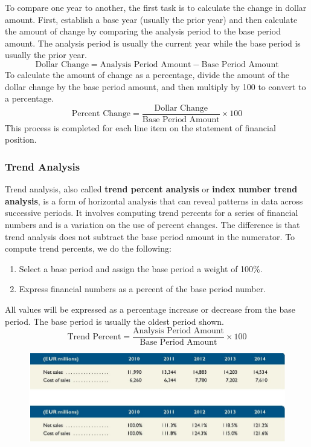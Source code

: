 \documentclass[../main.tex]{subfiles}
\begin{document}
	To compare one year to another, the first task is to calculate the change 
	in dollar amount.  First, establish a base year (usually the prior year) 
	and then calculate the amount of change by comparing the analysis period to 
	the base period amount. The analysis period is usually the current year 
	while the base period is usually the prior year.
	\[
	\text{Dollar Change} = \text{Analysis Period Amount} - \text{Base Period 
	Amount}
	\]
	To calculate the amount of change as a percentage, divide the amount of the 
	dollar change by the base period amount, and then multiply by 100 to 
	convert to a percentage. 
	\[
	\text{Percent Change} = \frac{\text{Dollar Change}}{\text{Base Period 
	Amount}} \times 100
	\]
	This process is completed for each line item on the statement of financial 
	position.
	
	\subsubsection{Trend Analysis}
	
	Trend analysis, also called \textbf{trend percent analysis} or 
	\textbf{index number trend analysis}, is a form of horizontal analysis that 
	can reveal patterns in data across successive periods. It involves 
	computing trend percents for a 
	series of financial numbers and is a variation on the use of percent 
	changes. The difference is that trend analysis does not subtract the base 
	period amount in the numerator. To compute trend percents, we do the 
	following:
	\begin{enumerate}[noitemsep]
		\item Select a base period and assign the base period a weight of 100\%.
		\item Express financial numbers as a percent of the base period number.
	\end{enumerate}
	All values will be expressed as a percentage increase or decrease from the 
	base period. The base period is usually the oldest period shown.
	\[
	\text{Trend Percent} = \frac{\text{Analysis Period Amount}}{\text{Base 
	Period Amount}} \times 100
	\]
	\begin{figure}[ht]
		\centering
		\includegraphics[width=\columnwidth]{images/c12/trend_analysis.png}
	\end{figure}
	
\end{document}
